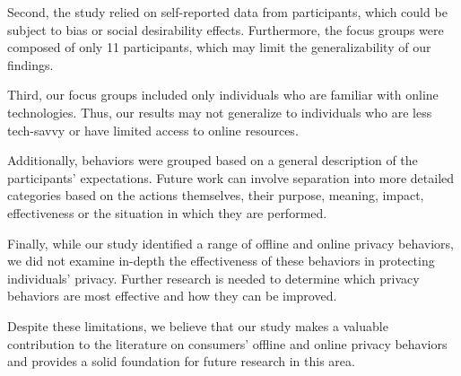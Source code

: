 Second, the study relied on self-reported data from participants, which could be subject to bias or social desirability effects. Furthermore, the focus groups were composed of only 11 participants, which may limit the generalizability of our findings. 

Third, our focus groups included only individuals who are familiar with online technologies. Thus, our results may not generalize to individuals who are less tech-savvy or have limited access to online resources. 

Additionally, behaviors were grouped based on a general description of the participants' expectations. Future work can involve separation into more detailed categories based on the actions themselves, their purpose, meaning, impact, effectiveness or the situation in which they are performed. 

Finally, while our study identified a range of offline and online privacy behaviors, we did not examine in-depth the effectiveness of these behaviors in protecting individuals' privacy. Further research is needed to determine which privacy behaviors are most effective and how they can be improved. 

Despite these limitations, we believe that our study makes a valuable contribution to the literature on consumers' offline and online privacy behaviors and provides a solid foundation for future research in this area. 


